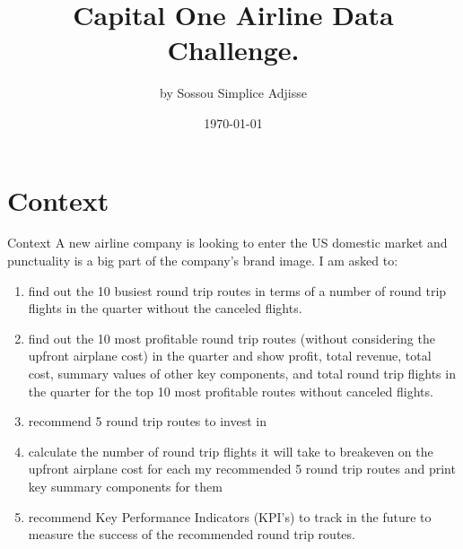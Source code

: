 \documentclass[aspectratio=1610]{beamer}
\title[]{Capital One Airline Data Challenge.}
\author{by Sossou Simplice Adjisse}
\institute{%
}
\date{\today}
\begin{document}
	

	\begin{frame}
		\titlepage
	\end{frame}
	
	\begin{frame}
		\tableofcontents
	\end{frame}
	



\section{Context}
\begin{frame}{Context}
	A new airline company is looking to enter the US domestic market and punctuality is a big part of the company's brand image. I am asked to: 
	\begin{enumerate}
		\item find out the 10 busiest round trip routes in terms of a number of round trip flights in the quarter without the canceled flights. 
		\item find out the 10 most profitable round trip routes (without considering the upfront airplane cost) in the quarter and show  profit,  total revenue, total cost, summary values of other key components, and total round trip flights in the quarter for the top 10 most profitable routes without canceled flights.
		\item recommend  5 round trip routes to invest in
		\item calculate the number of round trip flights it will take to breakeven on the upfront airplane cost for each my recommended 5 round trip routes and print key summary components for them
		\item recommend Key Performance Indicators (KPI's) to track in the future to measure the success of the recommended round trip routes. 
		
	\end{enumerate}
\end{frame}
\end{document}
